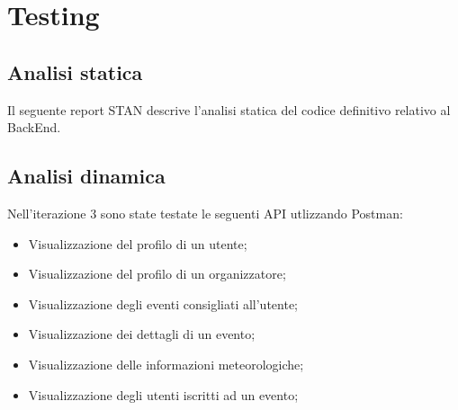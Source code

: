 \section{Testing}
\subsection{Analisi statica}
Il seguente report STAN descrive l'analisi statica del codice definitivo relativo al BackEnd.
\\


\subsection{Analisi dinamica}
Nell’iterazione 3 sono state testate le seguenti API utlizzando Postman:

\begin{itemize}
	\item Visualizzazione del profilo di un utente;
	\item Visualizzazione del profilo di un organizzatore;
	\item Visualizzazione degli eventi consigliati all'utente;
  \item Visualizzazione dei dettagli di un evento;
  \item Visualizzazione delle informazioni meteorologiche;
  \item Visualizzazione degli utenti iscritti ad un evento;
\end{itemize}

